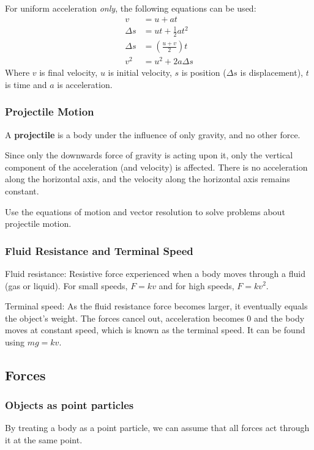 For uniform acceleration \textit{only}, the following equations can be used:
\begin{align*}
           v &= u + at \\
    \Delta s &= ut + \frac{1}{2}at^2 \\
    \Delta s &= \left( \frac{u + v}{2} \right) t \\
         v^2 &= u^2 + 2a \Delta s
\end{align*}
Where $v$ is final velocity, $u$ is initial velocity, $s$ is position ($\Delta s$ is
displacement), $t$ is time and $a$ is acceleration.

\subsubsection{Projectile Motion}
A \textbf{projectile} is a body under the influence of only gravity, and no
other force.

Since only the downwards force of gravity is acting upon it, only
the vertical component of the acceleration (and velocity) is affected. There is
no acceleration along the horizontal axis, and the velocity along the
horizontal axis remains constant.

Use the equations of motion and vector
resolution to solve problems about projectile motion.

\subsubsection{Fluid Resistance and Terminal Speed}

Fluid resistance: Resistive force experienced when a body moves through a fluid
(gas or liquid). For small speeds, $F=kv$ and for high speeds, $F=kv^2$.

Terminal speed: As the fluid resistance force becomes larger, it eventually
equals the object's weight. The forces cancel out, acceleration becomes 0 and
the body moves at constant speed, which is known as the terminal speed. It can
be found using $mg = kv$.

\subsection{Forces}

\subsubsection{Objects as point particles}
By treating a body as a point particle, we can assume that all forces act
through it at the same point.

